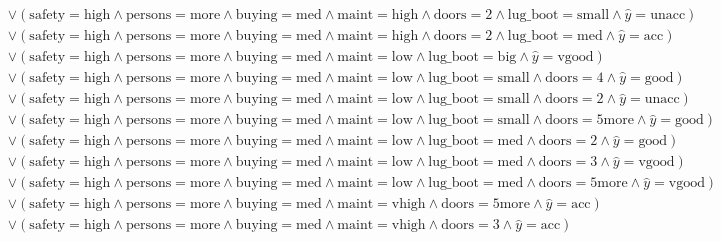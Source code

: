 \begin{scriptsize}
\[\begin{aligned}
  \\ & \lor (\text{safety}=\text{high} \land \text{persons}=\text{more} \land \text{buying}=\text{med} \land \text{maint}=\text{high} \land \text{doors}=\text{2} \land \text{lug_boot}=\text{small} \land \hat{y}=\text{unacc})
  \\ & \lor (\text{safety}=\text{high} \land \text{persons}=\text{more} \land \text{buying}=\text{med} \land \text{maint}=\text{high} \land \text{doors}=\text{2} \land \text{lug_boot}=\text{med} \land \hat{y}=\text{acc})
  \\ & \lor (\text{safety}=\text{high} \land \text{persons}=\text{more} \land \text{buying}=\text{med} \land \text{maint}=\text{low} \land \text{lug_boot}=\text{big} \land \hat{y}=\text{vgood})
  \\ & \lor (\text{safety}=\text{high} \land \text{persons}=\text{more} \land \text{buying}=\text{med} \land \text{maint}=\text{low} \land \text{lug_boot}=\text{small} \land \text{doors}=\text{4} \land \hat{y}=\text{good})
  \\ & \lor (\text{safety}=\text{high} \land \text{persons}=\text{more} \land \text{buying}=\text{med} \land \text{maint}=\text{low} \land \text{lug_boot}=\text{small} \land \text{doors}=\text{2} \land \hat{y}=\text{unacc})
  \\ & \lor (\text{safety}=\text{high} \land \text{persons}=\text{more} \land \text{buying}=\text{med} \land \text{maint}=\text{low} \land \text{lug_boot}=\text{small} \land \text{doors}=\text{5more} \land \hat{y}=\text{good})
  \\ & \lor (\text{safety}=\text{high} \land \text{persons}=\text{more} \land \text{buying}=\text{med} \land \text{maint}=\text{low} \land \text{lug_boot}=\text{med} \land \text{doors}=\text{2} \land \hat{y}=\text{good})
  \\ & \lor (\text{safety}=\text{high} \land \text{persons}=\text{more} \land \text{buying}=\text{med} \land \text{maint}=\text{low} \land \text{lug_boot}=\text{med} \land \text{doors}=\text{3} \land \hat{y}=\text{vgood})
  \\ & \lor (\text{safety}=\text{high} \land \text{persons}=\text{more} \land \text{buying}=\text{med} \land \text{maint}=\text{low} \land \text{lug_boot}=\text{med} \land \text{doors}=\text{5more} \land \hat{y}=\text{vgood})
  \\ & \lor (\text{safety}=\text{high} \land \text{persons}=\text{more} \land \text{buying}=\text{med} \land \text{maint}=\text{vhigh} \land \text{doors}=\text{5more} \land \hat{y}=\text{acc})
  \\ & \lor (\text{safety}=\text{high} \land \text{persons}=\text{more} \land \text{buying}=\text{med} \land \text{maint}=\text{vhigh} \land \text{doors}=\text{3} \land \hat{y}=\text{acc})

\end{aligned}\]
\end{scriptsize}
